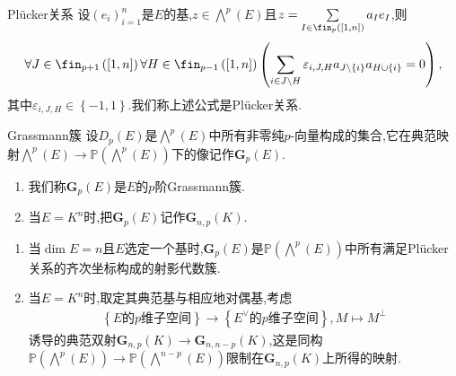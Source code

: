 \begin{definition}{Pl\"{u}cker关系}{}
	设$\left(e_{i}\right)_{i=1}^{n}$是$E$的基,$z\in\bigwedge\limits^{p}\left(E\right)$且$z=\sum\limits_{I\in\fin_{p}\left(\left[1,n\right]\right)}a_{I}e_{I}$,则
	\begin{align*}
		\forall J\in\fin_{p+1}\left(\left[1,n\right]\right)\forall H\in\fin_{p-1}\left(\left[1,n\right]\right)\left(\sum\limits_{i\in J\setminus H}\varepsilon_{i,J,H}a_{J\setminus\left\{i\right\}}a_{H\cup\left\{i\right\}}=0\right),
	\end{align*}
	其中$\varepsilon_{i,J,H}\in\left\{-1,1\right\}$.我们称上述公式是Pl\"{u}cker关系.
\end{definition}

\begin{definition}{Grassmann簇}{}
	设$D_{p}\left(E\right)$是$\bigwedge\limits^{p}\left(E\right)$中所有非零纯$p$-向量构成的集合,它在典范映射$\bigwedge\limits^{p}\left(E\right)\to\mathbb{P}\left(\bigwedge\limits^{p}\left(E\right)\right)$下的像记作$\mathbf{G}_{p}\left(E\right)$.
	\begin{enumerate}
		\item 我们称$\mathbf{G}_{p}\left(E\right)$是$E$的$p$阶Grassmann簇.
		\item 当$E=K^{n}$时,把$\mathbf{G}_{p}\left(E\right)$记作$\mathbf{G}_{n,p}\left(K\right)$.
	\end{enumerate}
\end{definition}

\begin{remark}{}{}
	\begin{enumerate}
		\item 当$\dim E=n$且$E$选定一个基时,$\mathbf{G}_{p}\left(E\right)$是$\mathbb{P}\left(\bigwedge\limits^{p}\left(E\right)\right)$中所有满足Pl\"{u}cker关系的齐次坐标构成的射影代数簇.
		\item 当$E=K^{n}$时,取定其典范基与相应地对偶基,考虑
		\begin{align*}
			\left\{E\text{的}p\text{维子空间}\right\}\to\left\{E^{\vee}\text{的}p\text{维子空间}\right\},M\mapsto M^{\perp}
		\end{align*}
		诱导的典范双射$\mathbf{G}_{n,p}\left(K\right)\to\mathbf{G}_{n,n-p}\left(K\right)$,这是同构$\mathbb{P}\left(\bigwedge\limits^{p}\left(E\right)\right)\to\mathbb{P}\left(\bigwedge\limits^{n-p}\left(E\right)\right)$限制在$\mathbf{G}_{n,p}\left(K\right)$上所得的映射.
	\end{enumerate}
\end{remark}




























